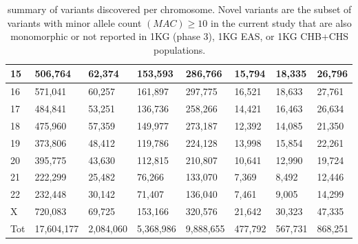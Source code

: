 \begin{table}[!ht]
\begin{tabular}{|l|l|l|l|l|l|l|l|}
        15 & 506,764 & 62,374 & 153,593 & 286,766 & 15,794 & 18,335 & 26,796 \\ \hline
        16 & 571,041 & 60,257 & 161,897 & 297,775 & 16,521 & 18,633 & 27,761 \\ \hline
        17 & 484,841 & 53,251 & 136,736 & 258,266 & 14,421 & 16,463 & 26,634 \\ \hline
        18 & 475,960 & 57,359 & 149,977 & 273,187 & 12,392 & 14,085 & 21,350 \\ \hline
         19 & 373,806 & 48,412 & 119,786 & 224,128 & 13,998 & 15,854 & 22,261 \\ \hline
        20 & 395,775 & 43,630 & 112,815 & 210,807 & 10,641 & 12,990 & 19,724 \\ \hline
        21 & 222,299 & 25,482 & 76,266 & 133,070 & 7,369 & 8,492 & 12,446 \\ \hline
        22 & 232,448 & 30,142 & 71,407 & 136,040 & 7,461 & 9,005 & 14,299 \\ \hline
        X & 720,083 & 69,725 & 153,166 & 320,576 & 21,642 & 30,323 & 47,335 \\ \hline
        Tot & 17,604,177 & 2,084,060 & 5,368,986 & 9,888,655 & 477,792 & 567,731 & 868,251 \\ \hline
    \end{tabular}
    \caption{summary of variants discovered per chromosome. Novel variants are the subset of variants with minor allele count $(MAC) \ge 10$ in the current study that are also monomorphic or not reported in 1KG (phase 3), 1KG EAS, or 1KG CHB+CHS populations.}
\label{table:2.3}
\end{table}
